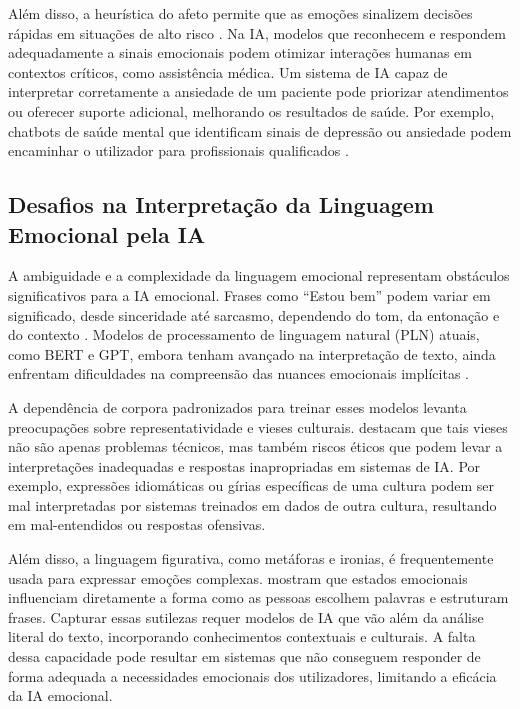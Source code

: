 \documentclass[a4paper,12pt]{report}
\begin{document}
	Além disso, a heurística do afeto permite que as emoções sinalizem decisões rápidas em situações de alto risco \parencite{slovic2007}. Na IA, modelos que reconhecem e respondem adequadamente a sinais emocionais podem otimizar interações humanas em contextos críticos, como assistência médica. Um sistema de IA capaz de interpretar corretamente a ansiedade de um paciente pode priorizar atendimentos ou oferecer suporte adicional, melhorando os resultados de saúde. Por exemplo, chatbots de saúde mental que identificam sinais de depressão ou ansiedade podem encaminhar o utilizador para profissionais qualificados \parencite{miner2016}.
	
	\subsection{Desafios na Interpretação da Linguagem Emocional pela IA}
	
	A ambiguidade e a complexidade da linguagem emocional representam obstáculos significativos para a IA emocional. Frases como “Estou bem” podem variar em significado, desde sinceridade até sarcasmo, dependendo do tom, da entonação e do contexto \parencite{pessoa2008}. Modelos de processamento de linguagem natural (PLN) atuais, como BERT e GPT, embora tenham avançado na interpretação de texto, ainda enfrentam dificuldades na compreensão das nuances emocionais implícitas \parencite{russell2020}.
	
	A dependência de corpora padronizados para treinar esses modelos levanta preocupações sobre representatividade e vieses culturais. \textcite{gigerenzer2009} destacam que tais vieses não são apenas problemas técnicos, mas também riscos éticos que podem levar a interpretações inadequadas e respostas inapropriadas em sistemas de IA. Por exemplo, expressões idiomáticas ou gírias específicas de uma cultura podem ser mal interpretadas por sistemas treinados em dados de outra cultura, resultando em mal-entendidos ou respostas ofensivas.
	
	Além disso, a linguagem figurativa, como metáforas e ironias, é frequentemente usada para expressar emoções complexas. \textcite{beukeboom2006} mostram que estados emocionais influenciam diretamente a forma como as pessoas escolhem palavras e estruturam frases. Capturar essas sutilezas requer modelos de IA que vão além da análise literal do texto, incorporando conhecimentos contextuais e culturais. A falta dessa capacidade pode resultar em sistemas que não conseguem responder de forma adequada a necessidades emocionais dos utilizadores, limitando a eficácia da IA emocional.
	
\end{document}
